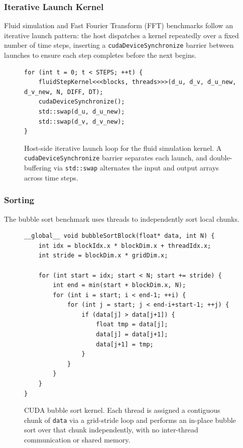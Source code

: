 \documentclass{article}
\begin{document}
\subsubsection{Iterative Launch Kernel}

Fluid simulation and Fast Fourier Transform (FFT) benchmarks follow an iterative launch pattern: the host dispatches a kernel repeatedly over a fixed number of time steps, inserting a \texttt{cudaDeviceSynchronize} barrier between launches to ensure each step completes before the next begins.

\begin{figure}[H]
\begin{verbatim}
for (int t = 0; t < STEPS; ++t) {
    fluidStepKernel<<<blocks, threads>>>(d_u, d_v, d_u_new, d_v_new, N, DIFF, DT);
    cudaDeviceSynchronize();
    std::swap(d_u, d_u_new);
    std::swap(d_v, d_v_new);
}
\end{verbatim}
\caption{Host-side iterative launch loop for the fluid simulation kernel. A \texttt{cudaDeviceSynchronize} barrier separates each launch, and double-buffering via \texttt{std::swap} alternates the input and output arrays across time steps.}
\label{fig:fluid-launch-loop}
\end{figure}

\subsubsection{Sorting}

The bubble sort benchmark uses threads to independently sort local chunks.

\begin{figure}[H]
\begin{verbatim}
__global__ void bubbleSortBlock(float* data, int N) {
    int idx = blockIdx.x * blockDim.x + threadIdx.x;
    int stride = blockDim.x * gridDim.x;

    for (int start = idx; start < N; start += stride) {
        int end = min(start + blockDim.x, N);
        for (int i = start; i < end-1; ++i) {
            for (int j = start; j < end-i+start-1; ++j) {
                if (data[j] > data[j+1]) {
                    float tmp = data[j];
                    data[j] = data[j+1];
                    data[j+1] = tmp;
                }
            }
        }
    }
}
\end{verbatim}
\caption{CUDA bubble sort kernel. Each thread is assigned a contiguous chunk of \texttt{data} via a grid-stride loop and performs an in-place bubble sort over that chunk independently, with no inter-thread communication or shared memory.}
\label{fig:bubblesort-kernel}
\end{figure}
\end{document}
